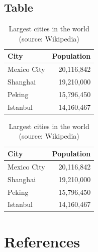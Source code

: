 \documentclass[
11pt,notheorems,hyperref={pdfauthor=Maghfira Ramadhani}
]{beamer}
\begin{document}
\subsection{Table}
\begin{frame}
    \begin{table}
        \caption{Largest cities in the world (source: Wikipedia)}
        \begin{tabular}{@{} lr @{}}
          \toprule
          City & Population\\
          \midrule
          Mexico City & 20,116,842\\
          Shanghai & 19,210,000\\
          Peking & 15,796,450\\
          Istanbul & 14,160,467\\
          \bottomrule
        \end{tabular}
        \hspace*{1cm}
            \setlength\extrarowheight{3pt}
        \begin{tabular}{|lr|}
          \hline
          \rowcolor{primary}\color{white}City & \color{white}Population\\
          \hline
          Mexico City & 20,116,842\\
          Shanghai & 19,210,000\\
          Peking & 15,796,450\\
          Istanbul & 14,160,467\\
          \hline
        \end{tabular}
    \end{table}
\end{frame}

\section{References}
\begin{frame}[allowframebreaks]
    \printbibliography
\end{frame}
\end{document}
